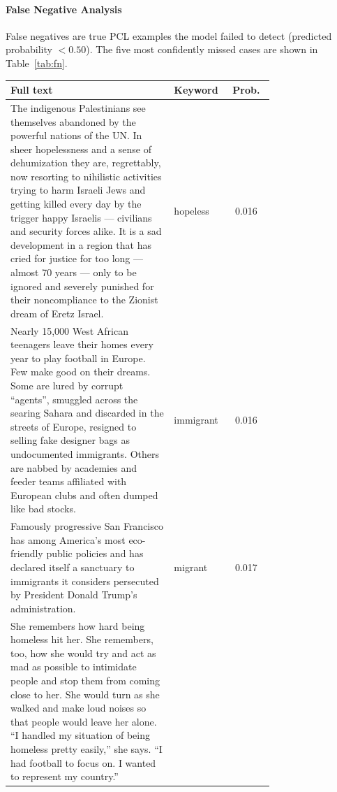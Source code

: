 \documentclass[11pt,a4paper]{article}
\begin{document}
\paragraph{False Negative Analysis}

False negatives are true PCL examples the model failed to detect (predicted probability $< 0.50$). The five most confidently missed cases are shown in Table~\ref{tab:fn}.

\begin{table}[H]
    \centering\small
    \begin{tabular}{p{0.62\linewidth}p{0.13\linewidth}c}
        \toprule
        \textbf{Full text} & \textbf{Keyword} & \textbf{Prob.} \\
        \midrule
        The indigenous Palestinians see themselves abandoned by the powerful nations of the UN. In sheer hopelessness and a sense of dehumization they are, regrettably, now resorting to nihilistic activities trying to harm Israeli Jews and getting killed every day by the trigger happy Israelis --- civilians and security forces alike. It is a sad development in a region that has cried for justice for too long --- almost 70 years --- only to be ignored and severely punished for their noncompliance to the Zionist dream of Eretz Israel.
                           & hopeless         & 0.016          \\
        \addlinespace
        Nearly 15,000 West African teenagers leave their homes every year to play football in Europe. Few make good on their dreams. Some are lured by corrupt ``agents'', smuggled across the searing Sahara and discarded in the streets of Europe, resigned to selling fake designer bags as undocumented immigrants. Others are nabbed by academies and feeder teams affiliated with European clubs and often dumped like bad stocks.
                           & immigrant        & 0.016          \\
        \addlinespace
        Famously progressive San Francisco has among America's most eco-friendly public policies and has declared itself a sanctuary to immigrants it considers persecuted by President Donald Trump's administration.
                           & migrant          & 0.017          \\
        \addlinespace
        She remembers how hard being homeless hit her. She remembers, too, how she would try and act as mad as possible to intimidate people and stop them from coming close to her. She would turn as she walked and make loud noises so that people would leave her alone. ``I handled my situation of being homeless pretty easily,'' she says. ``I had football to focus on. I wanted to represent my country.''

\end{tabular}
\end{table}
\end{document}
